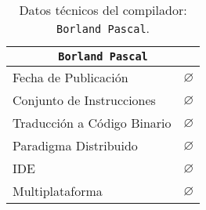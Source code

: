 \begin{table}[h]

\begin{center}

\begin{tabular}{|l|l|}\hline
\multicolumn{2}{|c|}{\texttt{Borland Pascal}}\\ 
\hline
\hline
Fecha de Publicación & $\varnothing$ \\ \hline
Conjunto de Instrucciones &  $\varnothing$ \\ \hline
Traducción a Código Binario & $\varnothing$ \\ \hline
Paradigma Distribuido & $\varnothing$ \\ \hline
IDE & $\varnothing$ \\ \hline
Multiplataforma & $\varnothing$ \\ \hline
\end{tabular}

\caption{Datos técnicos del compilador: \texttt{Borland Pascal}.}

\end{center}

\end{table}